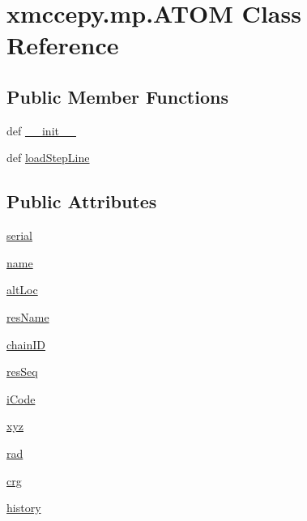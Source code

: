 \hypertarget{classxmccepy_1_1mp_1_1_a_t_o_m}{\section{xmccepy.\-mp.\-A\-T\-O\-M Class Reference}
\label{classxmccepy_1_1mp_1_1_a_t_o_m}
}
\subsection*{Public Member Functions}
\begin{DoxyCompactItemize}
\item 
def \hyperlink{classxmccepy_1_1mp_1_1_a_t_o_m_aa6e2fb4b7c8efc44b26b2b21964db907}{\-\_\-\-\_\-init\-\_\-\-\_\-}
\item 
def \hyperlink{classxmccepy_1_1mp_1_1_a_t_o_m_a136255ca36ba6682255e0c3c16b49c39}{load\-Step\-Line}
\end{DoxyCompactItemize}
\subsection*{Public Attributes}
\begin{DoxyCompactItemize}
\item 
\hyperlink{classxmccepy_1_1mp_1_1_a_t_o_m_a2cef52139b5235586607f4ba6fe44ee9}{serial}
\item 
\hyperlink{classxmccepy_1_1mp_1_1_a_t_o_m_a54ade2663ba22d42473d82bbb0731451}{name}
\item 
\hyperlink{classxmccepy_1_1mp_1_1_a_t_o_m_afbc19b6c21ca49dbe761479669a24c66}{alt\-Loc}
\item 
\hyperlink{classxmccepy_1_1mp_1_1_a_t_o_m_a8f4bed4463123a6d83abd93f69438ebe}{res\-Name}
\item 
\hyperlink{classxmccepy_1_1mp_1_1_a_t_o_m_a253ac66ab99349121fda0a6183f10a12}{chain\-I\-D}
\item 
\hyperlink{classxmccepy_1_1mp_1_1_a_t_o_m_ac91c801a2d8279659c74c69e820215a9}{res\-Seq}
\item 
\hyperlink{classxmccepy_1_1mp_1_1_a_t_o_m_a7ace60261d88bcbcd23f5e14a86b77e6}{i\-Code}
\item 
\hyperlink{classxmccepy_1_1mp_1_1_a_t_o_m_aebf9f0b985ccd236b1cd2dbf1161941e}{xyz}
\item 
\hyperlink{classxmccepy_1_1mp_1_1_a_t_o_m_ae56b3a55f15835108b393b32f6ac1878}{rad}
\item 
\hyperlink{classxmccepy_1_1mp_1_1_a_t_o_m_a0e3bac6ace5f4cc33db8eb20120764d4}{crg}
\item 
\hyperlink{classxmccepy_1_1mp_1_1_a_t_o_m_aa3702294f6091d253474476bfcd35f34}{history}
\end{DoxyCompactItemize}


